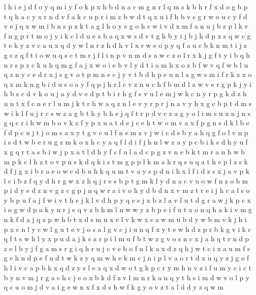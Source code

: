 \documentclass{article}
\begin{document}
l h i e j d f o y q m
i y f o k p x h b d u a c m g n r l
q m s k b h r f x d
o g b p t q h a c y x r n d v
f a k c u p r i m z b w d t q
x u i f h b v s g r w o
u c y f d v e j q x w m i b n s p z k t a g l h o
y e g o h c w i v d x m f a n u j b z p l k
v f n g p r t m o j y i k c l d u e z b a q x w s
d v t g h b y i j
b j h d p x s q w c g t e k y z v
c a u x q d y w l n r z h
d h v l x r w e o p y q f a u c b k n m t i j z g s
z q f t i o
w u q s c t m r j f l i n p
v n m d s a w c z o l r x k j g f t y i b q h
n r s p z c k u h q m g f a j x w o i e b v l y d t
i a m h x o z b f w v q
f w b l u q z n y c e d r x j s g v o t p m
n
e
c j y v t b d h p e u n l a g w s m i f r k z x o q
x m k n g b i d u s o a y f q p j h r l c v z
n u c h f b m d l a w v e r g p k j y i
h b s c d v k o u j
a y d v e
d p t b i r h g f s v u l e m j w k c n y
r p g k d z h u n t x f c
n e r l u m
j k t r h w a q z n l e v
y r p
r j n a v y h x g c b p t d m s w i k l f u
j r c s w z a g b t h y
b h e j q f t r p d v c z a g y o l i m s u x n
j n s g q c r i h w m b o v k z f y p x u a t d e
j c e h t w o m v a x f p g n s d k
l b e f d p c u j t
j o m s a x y t g v c u l f n e
m z v j w i c d s b y a h q g f o l
v n p i s d t w b e r u g z m k o x h c y a q f l
d i
f j h n l w z a y p c b i k s
d h y u f x g q r t a s b i w j p
x
a t l d h y f
s f u l a d c p g z v n e b k t m
r a n h w b m p k c l
h z t o v p n s k d
q k i s t m g p
p l k m a h r q s
u q a t h e p l z s k d f j g x i b
r a e o w c d b u h k
q u m t v a y s p d n i h x l
f i d z
s x j a v p k l c i b z f q y d h r g w
x z h q j r e s b p t g m k l y d n a c v u o w f
n z o b m p i d y e
d z n v g
z c g p j n q w r a i v o h y d b
d n x v m z t r e i j h c a l s o y b p u f
a j f w i v t
h e j k l v d
h p y q e s j x b z l a v f u t d g r
a w j k p
c x i o g w d p a k y n r j e q v z b h m l
n w
w y z b p e i f u t x o n q h a k
i v m g n k f d a j q z p w h b t x
d s m n x e l v k w
x s a w m u b
d y w b m v k j h i p x c n l
y c w l g u t e v j
o s a l g v c j i u n q f x y t e w h d z p r b k
g v i k c q f t s w h l y x p u d a j
k s a
r p i l m u f b t w z g v o s n c x j a h q
t r n d p z e l b y j f g a m
s r g i q h
r u j c v s b o f n l k a x d z q h
j w t c i x a u m f s g e h n d p
e f u
d t w k z y q m
w h e k m c j n i p l v a o r t d x u q y z
j g o f h l i v c a p b k x q d z y
s l e a q x d w o t g k p c r y m h n v z i f u
m y c
i c t b y n v m j r g a s h
c j e o x b k d f z v l m n
r k a n q y t h s i m d w v o l
p y q c u o m j d v a i g e w n x f
x d s h w f k g y o v z t a
l d
d y z q w m
\end{document}

